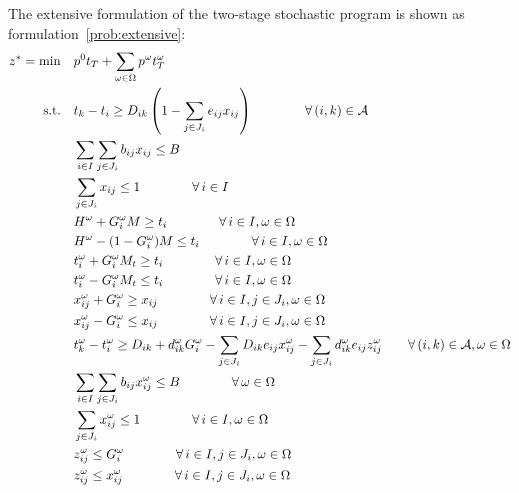 \documentclass[11pt]{article}
\newcommand{\cA}{{\cal A}}
\begin{document}
	\newline
	The extensive formulation of the two-stage stochastic program is shown as formulation~\eqref{prob:extensive}:
	\begin{subequations} \label{prob:extensive}
		\begin{align}
		z^* = \min \quad & p^0 t_T + \sum_{\omega \in \Omega} p^\omega t_T^\omega \\
		\text{s.t.} \quad & t_k - t_i \geq D_{ik} \left ( 1 - \sum_{j \in J_i} e_{ij} x_{ij} \right ) \qquad \qquad \forall \, (i,k) \in \cA \label{cons:Sep}\\
		& \sum_{i \in I} \sum_{j \in J_i} b_{ij}x_{ij} \leq B  \label{cons:Budget}\\
		& \sum_{j \in J_i} x_{ij} \leq 1  \qquad \qquad \forall \,i \in I \label{cons:SingleBudget}\\
		& H^\omega + G_i^\omega M \geq t_i \qquad \qquad \forall \,i \in I, \omega \in \Omega \label{cons:G1}\\
		& H^\omega - (1 - G_i^\omega) M \leq t_i \qquad \qquad \forall \,i \in I, \omega \in \Omega \label{cons:G2}\\
		& t_i^\omega + G_i^\omega M_t \geq t_i \qquad \qquad \forall \,i \in I, \omega \in \Omega \label{cons:tG1}\\
		& t_i^\omega - G_i^\omega M_t \leq t_i \qquad \qquad \forall \,i \in I, \omega \in \Omega \label{cons:tG2}\\
		& x_{ij}^\omega + G_i^\omega \geq x_{ij} \qquad \qquad \forall \,i \in I, j \in J_i, \omega \in \Omega \label{cons:xG1}\\
		& x_{ij}^\omega - G_i^\omega \leq x_{ij} \qquad \qquad \forall \,i \in I, j \in J_i, \omega \in \Omega \label{cons:xG2}\\
		& t_k^\omega - t_i^\omega \geq D_{ik} + d_{ik}^\omega G_i^\omega -\sum_{j \in J_i} D_{ik} e_{ij} x_{ij}^\omega - \sum_{j \in J_i} d_{ik}^\omega e_{ij} z_{ij}^\omega \qquad  \forall \,(i,k) \in \cA, \omega \in \Omega \label{cons:scenSep}\\
		& \sum_{i \in I}\sum_{j \in J_i} b_{ij}x_{ij}^\omega \leq B \qquad \qquad \forall \,\omega \in \Omega \label{cons:scenBudget}\\
		& \sum_{j \in J_i} x_{ij}^\omega \leq 1 \qquad \qquad \forall \,i \in I, \omega \in \Omega \label{cons:scenBudget1}\\
		& z_{ij}^\omega \leq G_i^\omega \qquad \qquad \forall \,i \in I, j \in J_i, \omega \in \Omega \label{cons:linearize1}\\
		& z_{ij}^\omega \leq x_{ij}^\omega \qquad \qquad \forall \,i \in I, j \in J_i, \omega \in \Omega \label{cons:linearize2}\\

\end{align}
\end{subequations}
\end{document}
